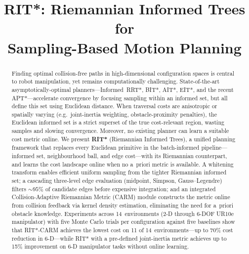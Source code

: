\documentclass[journal]{IEEEtran}
\begin{document}
\title{RIT*: Riemannian Informed Trees for\\Sampling-Based Motion Planning}

\author{
}


\maketitle

\begin{abstract}
Finding optimal collision-free paths in high-dimensional configuration
spaces is central to robot manipulation, yet remains computationally
challenging.
State-of-the-art asymptotically-optimal planners---Informed~RRT*,
BIT*, AIT*, EIT*, and the recent APT*---accelerate convergence by
focusing sampling within an informed set, but all define this set
using Euclidean distance. When traversal costs are anisotropic or
spatially varying (e.g.\ joint-inertia weighting, obstacle-proximity
penalties), the Euclidean informed set is a strict superset of the
true cost-relevant region, wasting samples and slowing convergence.
Moreover, no existing planner can learn a suitable cost metric online.
We present \textbf{RIT*} (Riemannian Informed Trees), a unified
planning framework that replaces every Euclidean primitive in the
batch-informed pipeline---informed set, neighbourhood ball, and edge
cost---with its Riemannian counterpart, and learns the cost landscape
online when no a~priori metric is available. A whitening transform
enables efficient uniform sampling from the tighter Riemannian
informed set; a cascading three-level edge evaluation (midpoint,
Simpson, Gauss--Legendre) filters ${\sim}95\%$ of candidate edges
before expensive integration; and an integrated Collision-Adaptive
Riemannian Metric (CARM) module constructs the metric online from
collision feedback via kernel density estimation, eliminating the need
for a~priori obstacle knowledge.
Experiments across 14~environments (2-D through 6-DOF UR10e
manipulator) with five Monte Carlo trials per configuration against
five baselines show that RIT*-CARM achieves the lowest cost on 11 of
14~environments---up to 70\% cost reduction in 6-D---while RIT* with
a pre-defined joint-inertia metric achieves up to 15\% improvement
on 6-D manipulator tasks without online learning.
\end{abstract}
\end{document}
